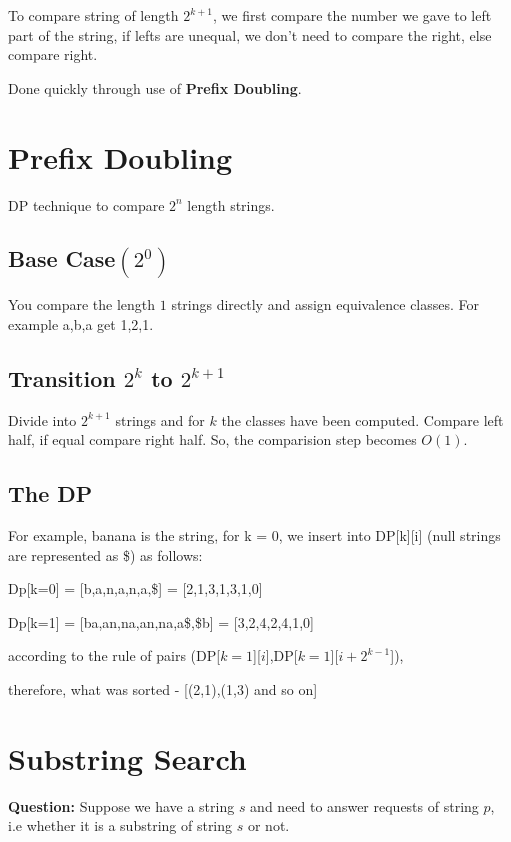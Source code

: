 \documentclass{article}
\begin{document}
	To compare string of length $2^{k+1}$, we first compare the number we gave to left part of the string, if lefts are unequal, we don't need to compare the right, else compare right.  \newline
	
	Done quickly through use of \textbf{Prefix Doubling}.
	
	\section{Prefix Doubling}
	
	DP technique to compare $2^n$ length strings. 
	\subsection{Base Case$(2^0)$}
	You compare the length $1$ strings directly and assign equivalence classes. For example a,b,a get 1,2,1.
	
	\subsection{Transition $2^k$ to $2^{k+1}$}
	Divide into $2^{k+1}$ strings and for $k$ the classes have been computed. Compare left half, if equal compare right half. So, the comparision step becomes $O(1)$.
	
	\subsection{The DP}
	For example, banana is the string, for k = 0, we insert into DP[k][i] (null strings are represented as \$) as follows: \newline 
	
	Dp[k=0] = [b,a,n,a,n,a,\$] = [2,1,3,1,3,1,0] \newline 
	
	Dp[k=1] = [ba,an,na,an,na,a\$,\$b] = [3,2,4,2,4,1,0] 
	
	according to the rule of pairs  (DP[$k=1$][$i$],DP[$k=1$][$i+2^{k-1}$]), 
	
	therefore, what was sorted - [(2,1),(1,3) and so on]
	
	\section{Substring Search}
	\textbf{Question:} Suppose we have a string $s$ and need to answer requests of string $p$, i.e whether it is a substring of string $s$ or not.  \newline
	
\end{document}
